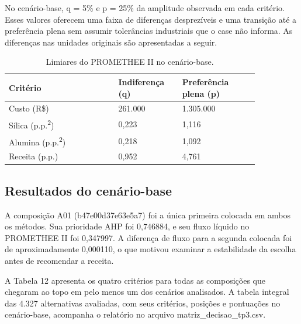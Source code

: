 \documentclass[12pt,a4paper]{article}
\begin{document}
No cenário-base, q = 5\% e p = 25\% da amplitude observada em cada critério. Esses valores oferecem uma faixa de diferenças desprezíveis e uma transição até a preferência plena sem assumir tolerâncias industriais que o case não informa. As diferenças nas unidades originais são apresentadas a seguir.

\begin{table}[H]
\centering
\small
\caption{Limiares do PROMETHEE II no cenário-base.}
\begin{tabular}{@{}p{0.374\linewidth}p{0.212\linewidth}p{0.264\linewidth}@{}}
\toprule
Critério & Indiferença (q) & Preferência plena (p) \\
\midrule
Custo (R\$) & 261.000 & 1.305.000 \\
Sílica (p.p.\textsuperscript{2}) & 0,223 & 1,116 \\
Alumina (p.p.\textsuperscript{2}) & 0,218 & 1,092 \\
Receita (p.p.) & 0,952 & 4,761 \\
\bottomrule
\end{tabular}
\end{table}

\clearpage

\subsection{Resultados do cenário-base}

A composição A01 (b47e00d37e63e5a7) foi a única primeira colocada em ambos os métodos. Sua prioridade AHP foi 0,746884, e seu fluxo líquido no PROMETHEE II foi 0,347997. A diferença de fluxo para a segunda colocada foi de aproximadamente 0,000110, o que motivou examinar a estabilidade da escolha antes de recomendar a receita.

A Tabela 12 apresenta os quatro critérios para todas as composições que chegaram ao topo em pelo menos um dos cenários analisados. A tabela integral das 4.327 alternativas avaliadas, com seus critérios, posições e pontuações no cenário-base, acompanha o relatório no arquivo matriz\_decisao\_tp3.csv.
\end{document}
